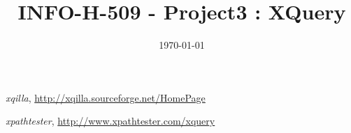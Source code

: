 \documentclass[a4paper, 11pt]{article}
\title{
	\textbf{INFO-H-509 - Project3 : XQuery}\\
}
\date{\today}
\begin{document}
\maketitle
\newpage

\tableofcontents
\newpage






\begin{thebibliography}{5}
 \emph{xqilla}, \href{http://xqilla.sourceforge.net/HomePage}{http://xqilla.sourceforge.net/HomePage}

 \emph{xpathtester}, \href{http://www.xpathtester.com/xquery}{http://www.xpathtester.com/xquery}
\end{thebibliography}
\end{document}
